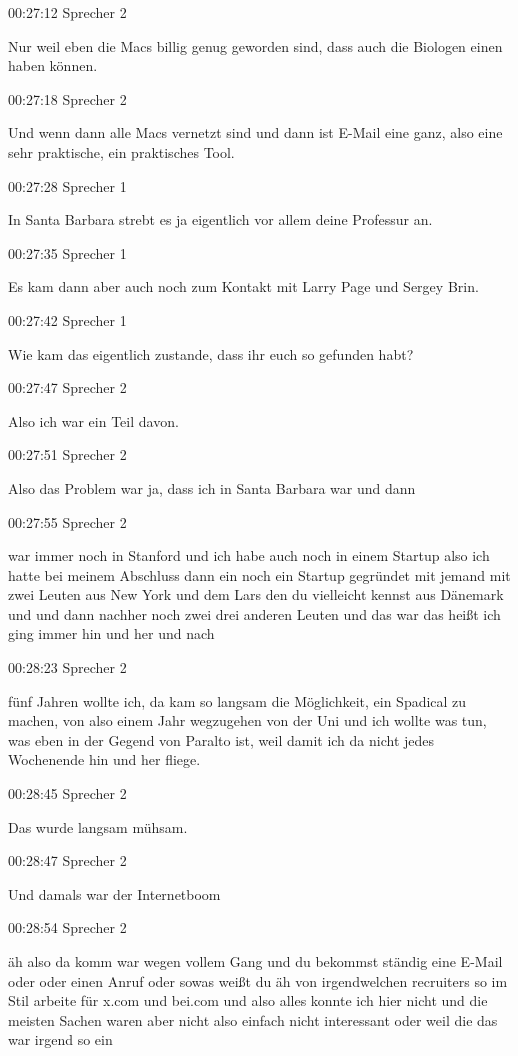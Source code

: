 00:27:12 Sprecher 2

Nur weil eben die Macs billig genug geworden sind, dass auch die
Biologen einen haben können.

00:27:18 Sprecher 2

Und wenn dann alle Macs vernetzt sind und dann ist E-Mail eine ganz,
also eine sehr praktische, ein praktisches Tool.

00:27:28 Sprecher 1

In Santa Barbara strebt es ja eigentlich vor allem deine Professur an.

00:27:35 Sprecher 1

Es kam dann aber auch noch zum Kontakt mit Larry Page und Sergey Brin.

00:27:42 Sprecher 1

Wie kam das eigentlich zustande, dass ihr euch so gefunden habt?

00:27:47 Sprecher 2

Also ich war ein Teil davon.

00:27:51 Sprecher 2

Also das Problem war ja, dass ich in Santa Barbara war und dann

00:27:55 Sprecher 2

war immer noch in Stanford und ich habe auch noch in einem Startup also
ich hatte bei meinem Abschluss dann ein noch ein Startup gegründet mit
jemand mit zwei Leuten aus New York und dem Lars den du vielleicht
kennst aus Dänemark und und dann nachher noch zwei drei anderen Leuten
und das war das heißt ich ging immer hin und her und nach

00:28:23 Sprecher 2

fünf Jahren wollte ich, da kam so langsam die Möglichkeit, ein Spadical
zu machen, von also einem Jahr wegzugehen von der Uni und ich wollte was
tun, was eben in der Gegend von Paralto ist, weil damit ich da nicht
jedes Wochenende hin und her fliege.

00:28:45 Sprecher 2

Das wurde langsam mühsam.

00:28:47 Sprecher 2

Und damals war der Internetboom

00:28:54 Sprecher 2

äh also da komm war wegen vollem Gang und du bekommst ständig eine
E-Mail oder oder einen Anruf oder sowas weißt du äh von irgendwelchen
recruiters so im Stil arbeite für x.com und bei.com und also alles
konnte ich hier nicht und die meisten Sachen waren aber nicht also
einfach nicht interessant oder weil die das war irgend so ein

